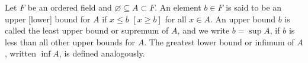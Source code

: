Let $F$ be an ordered field and $\varnothing \subseteq A \subset F$. An element $b \in F$ is said to be an upper [lower] bound for $A$ if $x \leq b$ $[x \geq b]$ for all $x \in A$. An upper bound $b$ is called the least upper bound or supremum of $A$, and we write $b = \sup A$, if $b$ is less than all other upper bounds for $A$. The greatest lower bound or infimum of $A$, written $\inf A$, is defined analogously.